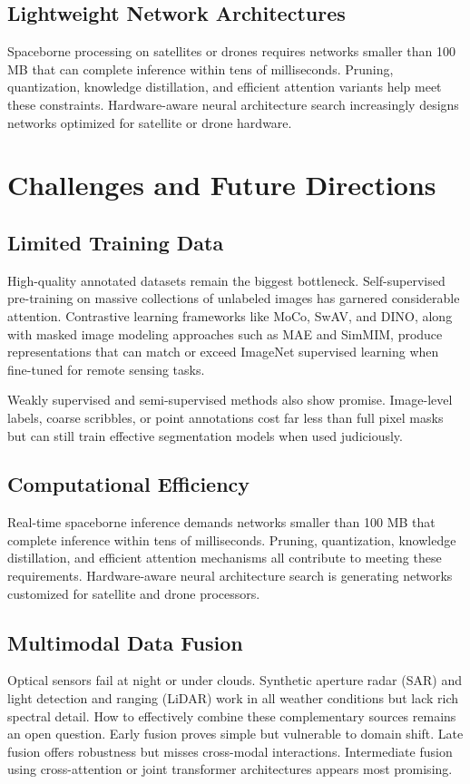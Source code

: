 \documentclass[12pt,a4paper]{article}
\begin{document}
\subsection{Lightweight Network Architectures}
Spaceborne processing on satellites or drones requires networks smaller than 100 MB that can complete inference within tens of milliseconds. Pruning, quantization, knowledge distillation, and efficient attention variants help meet these constraints. Hardware-aware neural architecture search increasingly designs networks optimized for satellite or drone hardware.

\section{Challenges and Future Directions}
\label{sec:challenges}
\subsection{Limited Training Data}
High-quality annotated datasets remain the biggest bottleneck. Self-supervised pre-training on massive collections of unlabeled images has garnered considerable attention. Contrastive learning frameworks like MoCo, SwAV, and DINO, along with masked image modeling approaches such as MAE and SimMIM, produce representations that can match or exceed ImageNet supervised learning when fine-tuned for remote sensing tasks.

Weakly supervised and semi-supervised methods also show promise. Image-level labels, coarse scribbles, or point annotations cost far less than full pixel masks but can still train effective segmentation models when used judiciously.

\subsection{Computational Efficiency}
Real-time spaceborne inference demands networks smaller than 100 MB that complete inference within tens of milliseconds. Pruning, quantization, knowledge distillation, and efficient attention mechanisms all contribute to meeting these requirements. Hardware-aware neural architecture search is generating networks customized for satellite and drone processors.

\subsection{Multimodal Data Fusion}
Optical sensors fail at night or under clouds. Synthetic aperture radar (SAR) and light detection and ranging (LiDAR) work in all weather conditions but lack rich spectral detail. How to effectively combine these complementary sources remains an open question. Early fusion proves simple but vulnerable to domain shift. Late fusion offers robustness but misses cross-modal interactions. Intermediate fusion using cross-attention or joint transformer architectures appears most promising.
\end{document}
